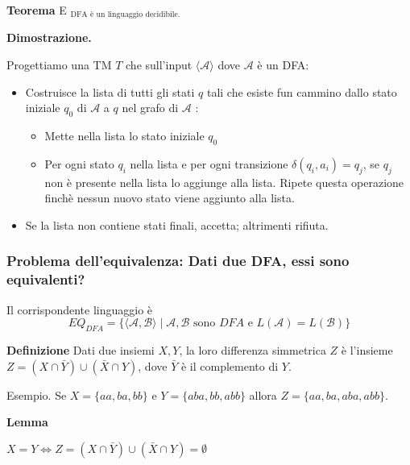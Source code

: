 \vspace{5mm}

\textbf{Teorema}
E $_{\text {DFA è un linguaggio decidibile. }}$

\vspace{5mm}

\textbf{Dimostrazione.}

Progettiamo una TM $T$ che sull'input $\langle\mathcal{A}\rangle$ dove $\mathcal{A}$ è un DFA:
\begin{itemize}
    \item Costruisce la lista di tutti gli stati $q$ tali che esiste fun cammino dallo stato iniziale $q_{0}$ di $\mathcal{A}$ a $q$ nel grafo di $\mathcal{A}$ :
    \begin{itemize}
        \item Mette nella lista lo stato iniziale $q_{0}$
        \item Per ogni stato $q_{i}$ nella lista e per ogni transizione $\delta\left(q_{i}, a_{i}\right)=q_{j}$, se $q_{j}$ non è presente nella lista lo aggiunge alla lista. Ripete questa operazione finchè nessun nuovo stato viene aggiunto alla lista.
    \end{itemize}
    \item Se la lista non contiene stati finali, accetta; altrimenti rifiuta.
\end{itemize}

\subsubsection{Problema dell'equivalenza: Dati due DFA, essi sono
equivalenti?}

Il corrispondente linguaggio è
$$
E Q_{D F A}=\{\langle\mathcal{A}, \mathcal{B}\rangle \mid \mathcal{A}, \mathcal{B} \text { sono } D F A \text { e } L(\mathcal{A})=L(\mathcal{B})\}
$$


\textbf{Definizione}
Dati due insiemi $X, Y$, la loro differenza simmetrica $Z$ è l'insieme $Z=(X \cap \bar{Y}) \cup(\bar{X} \cap Y)$, dove $\bar{Y}$ è il complemento di $Y$.

Esempio. Se $X=\{a a, b a, b b\}$ e $Y=\{a b a, b b, a b b\}$ allora $Z=\{a a, b a, a b a, a b b\} .$

\vspace{5mm}


\textbf{Lemma}

$X=Y \Leftrightarrow Z=(X \cap \bar{Y}) \cup(\bar{X} \cap Y)=\emptyset$

\vspace{5mm}

